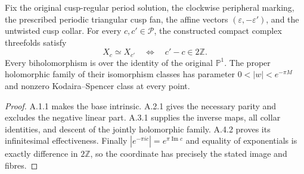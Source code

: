 \begin{theorem}\label{fam:src:A.5.1}\label{fam:st:A.5.1}
Fix the original cusp-regular period solution, the clockwise peripheral marking, the prescribed periodic triangular cusp fan, the affine vectors $(\varepsilon,-\varepsilon')$, and the untwisted cusp collar. For every $c,c'\in\mathcal P$, the constructed compact complex threefolds satisfy
\[
 X_c\simeq X_{c'}\quad\Longleftrightarrow\quad c'-c\in2\mathbb Z.
\]
Every biholomorphism is over the identity of the original $\mathbb P^1$. The proper holomorphic family of their isomorphism classes has parameter $0<|w|<e^{-\pi M}$ and nonzero Kodaira--Spencer class at every point.
\end{theorem}
\begin{proof}
A.1.1 makes the base intrinsic. A.2.1 gives the necessary parity and excludes the negative linear part. A.3.1 supplies the inverse maps, all collar identities, and descent of the jointly holomorphic family. A.4.2 proves its infinitesimal effectiveness. Finally $|e^{-\pi ic}|=e^{\pi\operatorname{Im}c}$ and equality of exponentials is exactly difference in $2\mathbb Z$, so the coordinate has precisely the stated image and fibres.
\end{proof}

